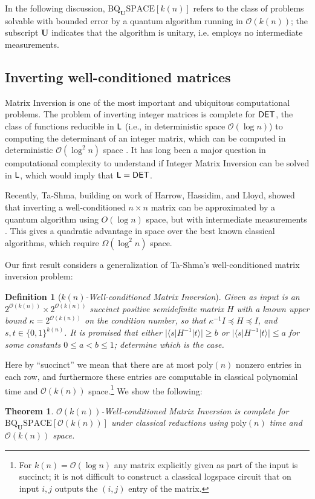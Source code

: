 \documentclass[11pt]{article}
\newtheorem{theorem}{Theorem}
\newtheorem{definition}{Definition}
\theoremstyle{definition}
\theoremstyle{remark}
\newcommand\DET{{\sf{DET}}}
\newcommand\Logspace{{\sf{L}}}
\newcommand\matrixinvert[1]{{\ensuremath{#1}}\textit{-Well-conditioned Matrix Inversion}}
\newcommand{\classfont}{\mathrm}
\newcommand{\Unitary}{\mathbf{U}}
\newcommand{\unitaryBQSPACE}[1]{\classfont{BQ}_\Unitary\classfont{SPACE}[#1]}
\newcommand\bigoh{\mathcal{O}}
\newcommand{\poly}{\textrm{poly}}
\begin{document}
In the following discussion, $\unitaryBQSPACE{k(n)}$ refers to the class of problems solvable with bounded error by a quantum algorithm running in $\mathcal{O}(k(n))$; the subscript $\Unitary$ indicates that the algorithm is unitary, i.e. employs no intermediate measurements.
\subsection{Inverting well-conditioned matrices}
Matrix Inversion is one of the most important and ubiquitous computational problems.  The problem of inverting integer matrices is complete for $\DET$, the class of functions reducible in $\Logspace$ (i.e., in deterministic space $\bigoh(\log{n})$) to computing the determinant of an integer matrix, which can be computed in deterministic $\bigoh(\log^2{n})$ space \cite{berkowitz, cook}.  It has long been a major question in computational complexity to understand if Integer Matrix Inversion can be solved in $\Logspace$, which would imply that $\Logspace=\DET$.

Recently, Ta-Shma, building on work of Harrow, Hassidim, and Lloyd, showed that inverting a well-conditioned $n \times n$ matrix can be approximated by a quantum algorithm using $O(\log n)$ space, but with intermediate measurements \cite{tashma,HHL}. This gives a quadratic advantage in space over the best known classical algorithms, which require $\Omega(\log^2n)$ space.

Our first result considers a generalization of Ta-Shma's well-conditioned matrix inversion problem:
\begin{definition}[\matrixinvert{k(n)}]
	Given as input is an $2^{\bigoh (k(n))} \times 2^{\bigoh (k(n))}$ succinct positive semidefinite matrix $H$ with a known upper bound $\kappa = 2^{\mathcal{O}(k(n))}$ on the condition number, so that $\kappa^{-1}I\preceq H \preceq I$, and $s,t\in \lbrace 0,1\rbrace^{k(n)}$. It is promised that either $|\langle s|H^{-1}|t\rangle|\geq b$
 or $|\langle s|H^{-1}|t\rangle|\leq a$ for some constants $0 \le a < b \le 1$; determine which is the case.
 \end{definition}

Here by ``succinct'' we mean that there are at most $\poly(n)$ nonzero entries in each row, and furthermore these entries are computable in classical polynomial time and $\mathcal{O}(k(n))$ space.\footnote{For $k(n) = \mathcal{O}(\log n)$ any matrix explicitly given as part of the input is succinct; it is not difficult to construct a classical logspace circuit that on input $i,j$ outputs the $(i,j)$ entry of the matrix.} We show the following:
\begin{theorem}
\matrixinvert{\mathcal{O}(k(n))} is complete for $\unitaryBQSPACE{\mathcal{O}(k(n))}$ under classical reductions using $\poly(n)$ time and $\mathcal{O}(k(n))$ space.
\end{theorem}
\end{document}
